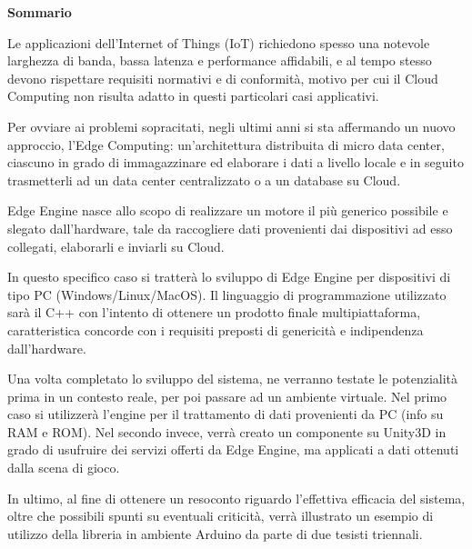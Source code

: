 \clearpage
\renewcommand{\headrulewidth}{0pt}
\begin{center}
	\huge{\textbf{Sommario}}
\end{center}
\null{}
Le applicazioni dell'Internet of Things (IoT) richiedono spesso una notevole larghezza di banda, bassa latenza e performance affidabili, e al tempo stesso devono rispettare requisiti normativi e di conformità, motivo per cui il Cloud Computing non risulta adatto in questi particolari casi applicativi.

Per ovviare ai problemi sopracitati, negli ultimi anni si sta affermando un nuovo approccio, l'Edge Computing: un’architettura distribuita di micro data center, ciascuno in grado di immagazzinare ed elaborare i dati a livello locale e in seguito trasmetterli ad un data center centralizzato o a un database su Cloud.

Edge Engine nasce allo scopo di realizzare un motore il più generico possibile e slegato dall'hardware, tale da raccogliere dati provenienti dai dispositivi ad esso collegati, elaborarli e inviarli su Cloud.

In questo specifico caso si tratterà lo sviluppo di Edge Engine per dispositivi di tipo PC (Windows/Linux/MacOS). Il linguaggio di programmazione utilizzato sarà il C++ con l'intento di ottenere un prodotto finale multipiattaforma, caratteristica concorde con i requisiti preposti di genericità e indipendenza dall'hardware.

Una volta completato lo sviluppo del sistema, ne verranno testate le potenzialità prima in un contesto reale, per poi passare ad un ambiente virtuale. Nel primo caso si utilizzerà l'engine per il trattamento di dati provenienti da PC (info su RAM e ROM). Nel secondo invece, verrà creato un componente su Unity3D in grado di usufruire dei servizi offerti da Edge Engine, ma applicati a dati ottenuti dalla scena di gioco.

In ultimo, al fine di ottenere un resoconto riguardo l'effettiva efficacia del sistema, oltre che possibili spunti su eventuali criticità, verrà illustrato un esempio di utilizzo della libreria in ambiente Arduino da parte di due tesisti triennali.
\null{}
\clearpage
\renewcommand{\headrulewidth}{0.5pt}

